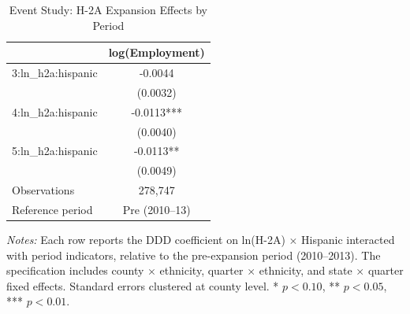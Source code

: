 \begin{table}[htbp]
\centering
\caption{Event Study: H-2A Expansion Effects by Period}
\label{tab:event}
\small
\begin{tabular}{lc}
\hline\hline
 & log(Employment) \\
\hline
3:ln_h2a:hispanic & -0.0044 \\
 & (0.0032) \\
4:ln_h2a:hispanic & -0.0113*** \\
 & (0.0040) \\
5:ln_h2a:hispanic & -0.0113** \\
 & (0.0049) \\
Observations & 278,747 \\
Reference period & Pre (2010--13) \\
\hline\hline
\end{tabular}
\begin{tablenotes}
\item \textit{Notes:} Each row reports the DDD coefficient on ln(H-2A) $\times$ Hispanic interacted with period indicators, relative to the pre-expansion period (2010--2013). The specification includes county $\times$ ethnicity, quarter $\times$ ethnicity, and state $\times$ quarter fixed effects. Standard errors clustered at county level. * $p<0.10$, ** $p<0.05$, *** $p<0.01$.
\end{tablenotes}
\end{table}

